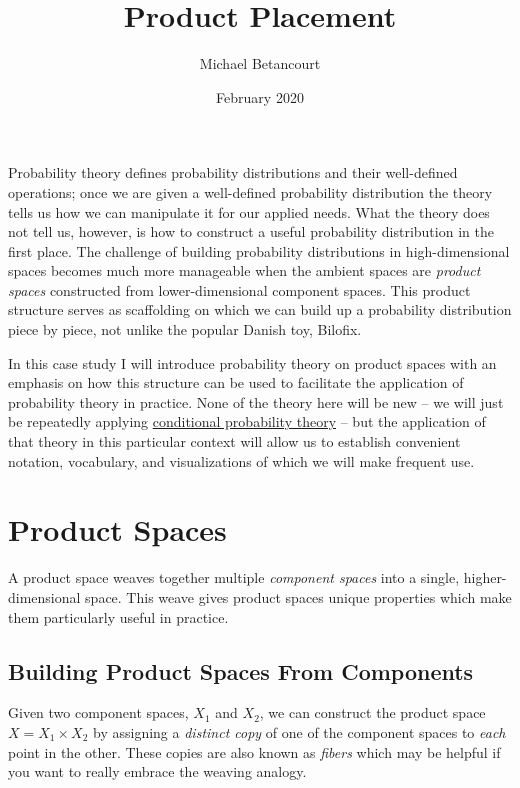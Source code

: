 \documentclass[]{article}
\title{Product Placement}
\author{Michael Betancourt}
\date{February 2020}
\begin{document}
\maketitle

Probability theory defines probability distributions and their
well-defined operations; once we are given a well-defined probability
distribution the theory tells us how we can manipulate it for our
applied needs. What the theory does not tell us, however, is how to
construct a useful probability distribution in the first place. The
challenge of building probability distributions in high-dimensional
spaces becomes much more manageable when the ambient spaces are
\emph{product spaces} constructed from lower-dimensional component
spaces. This product structure serves as scaffolding on which we can
build up a probability distribution piece by piece, not unlike the
popular Danish toy, Bilofix.

In this case study I will introduce probability theory on product spaces
with an emphasis on how this structure can be used to facilitate the
application of probability theory in practice. None of the theory here
will be new -- we will just be repeatedly applying
\href{https://betanalpha.github.io/assets/case_studies/conditional_probability_theory.html}{conditional
probability theory} -- but the application of that theory in this
particular context will allow us to establish convenient notation,
vocabulary, and visualizations of which we will make frequent use.

\hypertarget{product-spaces}{%
\section{Product Spaces}\label{product-spaces}}

A product space weaves together multiple \emph{component spaces} into a
single, higher-dimensional space. This weave gives product spaces unique
properties which make them particularly useful in practice.

\hypertarget{sec:building_product_spaces}{%
\subsection{Building Product Spaces From
Components}\label{sec:building_product_spaces}}

Given two component spaces, \(X_{1}\) and \(X_{2}\), we can construct
the product space \(X = X_{1} \times X_{2}\) by assigning a
\emph{distinct copy} of one of the component spaces to \emph{each} point
in the other. These copies are also known as \emph{fibers} which may be
helpful if you want to really embrace the weaving analogy.
\end{document}
